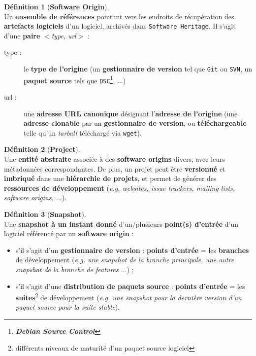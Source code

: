 \documentclass[12pt,a4paper]{report}
\theoremstyle{definition}
\newtheorem*{definition}{Définition}
\begin{document}
\begin{definition}[\textbf{Software Origin}]\mbox{}\\
Un \textbf{ensemble de références} pointant vers les endroits de récupération des \textbf{artefacts logiciels} d'un logiciel, archivés dans \texttt{Software Heritage}. Il s'agit d'une \textbf{paire} $<$\emph{type}, \emph{url}$>$ :
\begin{description}
	\item [type :] le \textbf{type de l'origine} (un \textbf{gestionnaire de version} tel que \texttt{Git} ou \texttt{SVN}, un \textbf{paquet source} tels que \texttt{DSC}\footnote{\textbf{\textit{Debian Source Control}}}, $\dots$)
	\item [url :] une \textbf{adresse URL canonique} désignant l'\textbf{adresse de l'origine} (une \textbf{adresse clonable} par un \textbf{gestionnaire de version}, ou \textbf{téléchargeable} telle qu'un \textit{tarball} téléchargé via \texttt{wget}).
\end{description}
\end{definition}

\begin{definition}[\textbf{Project}]\mbox{}\\
Une \textbf{entité abstraite} associée à des \textbf{software origins} divers, avec leurs métadonnées correspondantes. De plus, un projet peut être \textbf{versionné} et \textbf{imbriqué} dans une \textbf{hiérarchie de projets}, et permet de générer des \textbf{ressources de développement} (\textit{e.g. websites, issue trackers, mailing lists, software origins, $\dots$}).
\end{definition}

\begin{definition}[\textbf{Snapshot}]\mbox{}\\
Une \textbf{snapshot à un instant donné} d'un/plusieurs \textbf{point(s) d'entrée} d'un logiciel référencé par un \textbf{software origin} :
\begin{itemize}
	\item s'il s'agit d'un \textbf{gestionnaire de version} : \textbf{points d'entrée} = les \textbf{branches} de développement (\textit{e.g. une snapshot de la branche principale, une autre snapshot de la branche de features $\dots$}) ;
	\item s'il s'agit d'une \textbf{distribution de paquets source} : \textbf{points d'entrée} = les \textbf{suites}\footnote{différents niveaux de maturité d'un paquet source logiciel} de développement (\textit{e.g. une snapshot pour la dernière version d'un paquet source pour la suite stable}).
\end{itemize}
\end{definition}
\end{document}
